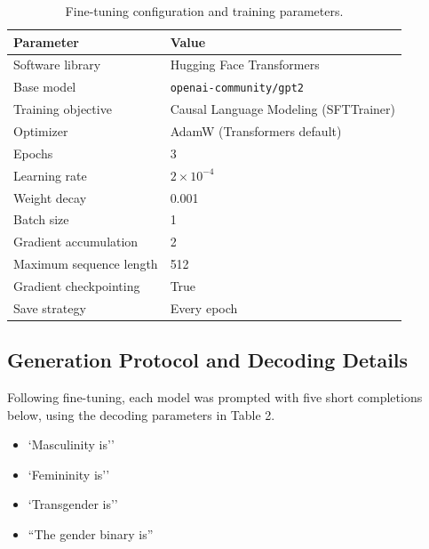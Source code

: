 \documentclass[anonymous,review]{acmart}
\begin{document}
\begin{table}[t]
\caption{Fine-tuning configuration and training parameters.}
\label{tab:training-parameters}
\centering
\begin{tabular}{ll}
\toprule
\textbf{Parameter} & \textbf{Value} \\
\midrule
Software library & Hugging Face Transformers \\
Base model & \texttt{openai-community/gpt2} \\
Training objective & Causal Language Modeling (SFTTrainer) \\
Optimizer & AdamW (Transformers default) \\
\midrule
Epochs & 3 \\
Learning rate & $2 \times 10^{-4}$ \\
Weight decay & 0.001 \\
Batch size & 1 \\
Gradient accumulation & 2 \\
Maximum sequence length & 512 \\
Gradient checkpointing & True \\
Save strategy & Every epoch \\
\bottomrule
\end{tabular}
\end{table}

\subsection{Generation Protocol and Decoding Details}
\label{appendix:generation}

Following fine-tuning, each model was prompted with five short completions below, using the decoding parameters in Table 2.

\begin{itemize}
\item `Masculinity is''
    \item `Femininity is''
\item `Transgender is''
\item ``The gender binary is''
\end{itemize}
\end{document}
